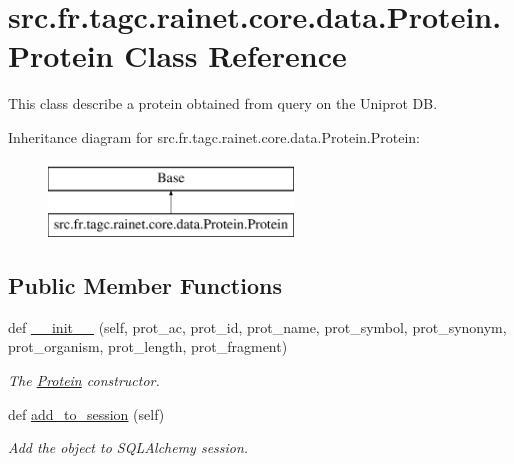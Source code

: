 \hypertarget{classsrc_1_1fr_1_1tagc_1_1rainet_1_1core_1_1data_1_1Protein_1_1Protein}{}\section{src.\+fr.\+tagc.\+rainet.\+core.\+data.\+Protein.\+Protein Class Reference}
\label{classsrc_1_1fr_1_1tagc_1_1rainet_1_1core_1_1data_1_1Protein_1_1Protein}


This class describe a protein obtained from query on the Uniprot D\+B.  


Inheritance diagram for src.\+fr.\+tagc.\+rainet.\+core.\+data.\+Protein.\+Protein\+:\begin{figure}[H]
\begin{center}
\leavevmode
\includegraphics[height=2.000000cm]{classsrc_1_1fr_1_1tagc_1_1rainet_1_1core_1_1data_1_1Protein_1_1Protein}
\end{center}
\end{figure}
\subsection*{Public Member Functions}
\begin{DoxyCompactItemize}
\item 
def \hyperlink{classsrc_1_1fr_1_1tagc_1_1rainet_1_1core_1_1data_1_1Protein_1_1Protein_a2ef26c34c2c219ed62056ac37cc540cb}{\+\_\+\+\_\+init\+\_\+\+\_\+} (self, prot\+\_\+ac, prot\+\_\+id, prot\+\_\+name, prot\+\_\+symbol, prot\+\_\+synonym, prot\+\_\+organism, prot\+\_\+length, prot\+\_\+fragment)
\begin{DoxyCompactList}\small\item\em The \hyperlink{classsrc_1_1fr_1_1tagc_1_1rainet_1_1core_1_1data_1_1Protein_1_1Protein}{Protein} constructor. \end{DoxyCompactList}\item 
\hypertarget{classsrc_1_1fr_1_1tagc_1_1rainet_1_1core_1_1data_1_1Protein_1_1Protein_a388c7e4636cc5726d58b1415e96786b4}{}def \hyperlink{classsrc_1_1fr_1_1tagc_1_1rainet_1_1core_1_1data_1_1Protein_1_1Protein_a388c7e4636cc5726d58b1415e96786b4}{add\+\_\+to\+\_\+session} (self)\label{classsrc_1_1fr_1_1tagc_1_1rainet_1_1core_1_1data_1_1Protein_1_1Protein_a388c7e4636cc5726d58b1415e96786b4}

\begin{DoxyCompactList}\small\item\em Add the object to S\+Q\+L\+Alchemy session. \end{DoxyCompactList}\end{DoxyCompactItemize}
